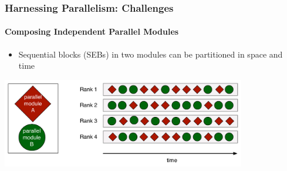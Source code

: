 \begin{frame}[fragile]
\frametitle{Harnessing Parallelism: Challenges}
\framesubtitle{Composing Independent Parallel Modules}
  \begin{itemize}
    \item Sequential blocks (SEBs) in two modules can be partitioned in space
      and time
  \end{itemize}
  \begin{center}
    \includegraphics[width=0.8\textwidth]{figures/composition.pdf}
  \end{center}
\end{frame}
